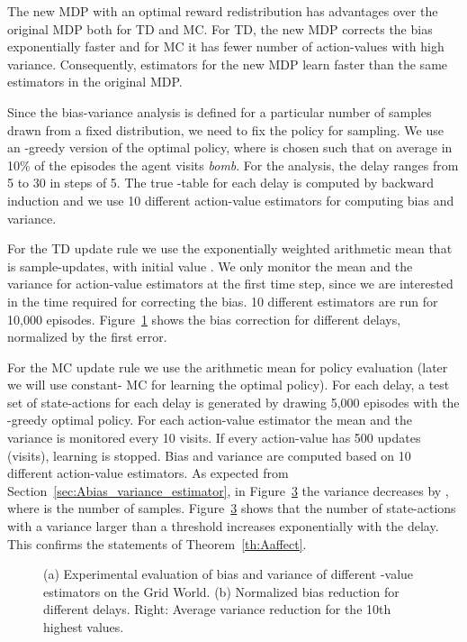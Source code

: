 \documentclass{article}
\newcommand{\figpath}{figures/}
\begin{document}
\begin{appendices}
The new MDP with an optimal reward redistribution has advantages over
the original MDP both for TD and MC. For TD, the new MDP corrects the bias exponentially faster and 
for MC it has fewer number of action-values with high variance. 
Consequently, estimators for the new MDP learn faster 
than the same estimators in the original MDP.

Since the bias-variance analysis is defined for a particular number of samples 
drawn from a fixed distribution, we need to fix the policy for sampling. 
We use an -greedy version of the optimal policy, where
 is chosen such that on average in 10\% of the episodes the agent 
visits {\em bomb}. For the analysis, the delay ranges from 5 to 30 in steps of 5.
The true -table for each delay is computed 
by backward induction and we use 10 different action-value estimators 
for computing bias and variance.

For the TD update rule we use the exponentially weighted arithmetic mean that is sample-updates,
with initial value .
We only monitor the mean and the variance for action-value 
estimators at the first time step, 
since we are interested in the time required for correcting the bias.  
10 different estimators are run for 10,000 episodes. Figure~\ref{fig:A_TDbias} shows the bias correction for different delays, normalized by the first error.


For the MC update rule we use the arithmetic mean for policy evaluation
(later we will use constant- MC for learning the optimal policy).
For each delay, a test set of state-actions for each delay is generated 
by drawing 5,000 episodes with the -greedy optimal policy. 
For each action-value estimator the mean and the variance 
is monitored every 10 visits. If every action-value has 500 updates (visits), 
learning is stopped. Bias and variance are computed based on 10 different 
action-value estimators.
As expected from Section~\ref{sec:Abias_variance_estimator}, in Figure~\ref{fig:A_MCvar}
the variance decreases by , where  is the number of samples.
Figure~\ref{fig:A_MCvar} shows that the number of state-actions with a variance larger than a threshold 
increases exponentially with the delay.
This confirms the statements of Theorem~\ref{th:Aaffect}. 

\begin{figure}[htp]
 \centering
 \begin{subfigure}{.49\textwidth}
  \centering {}\caption{\label{fig:A_TDbias}}
 \end{subfigure}
 \begin{subfigure}{.49\textwidth}
  \centering {}\caption{\label{fig:A_MCvar}}
 \end{subfigure}\caption{(a) Experimental evaluation of bias and variance of
          different -value estimators on the Grid World.
          (b) Normalized bias reduction for different delays.
          Right: Average variance reduction for the 10th highest values.
          }
          

\end{figure}
\end{appendices}
\end{document}
